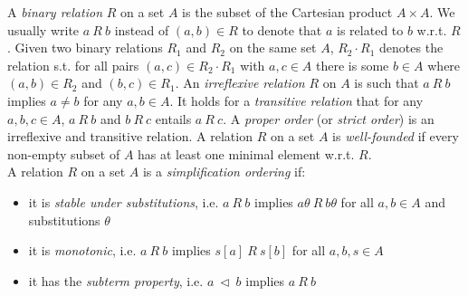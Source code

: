 A \textit{binary relation} $R$ on a set $A$ is the subset of the Cartesian product $A\times A$. We usually write $a\ R\ b$ instead of $(a,b)\in R$ to denote that $a$ is related to $b$ w.r.t. $R$. Given two binary relations $R_1$ and $R_2$ on the same set $A$, $R_2\cdot R_1$ denotes the relation s.t. for all pairs $(a,c)\in R_2\cdot R_1$ with $a,c\in A$ there is some $b\in A$ where $(a,b)\in R_2$ and $(b,c)\in R_1$. An \textit{irreflexive relation} $R$ on $A$ is such that $a\ R\ b$ implies $a\neq b$ for any $a,b\in A$. It holds for a \textit{transitive relation} that for any $a,b,c\in A$, $a\ R\ b$ and $b\ R\ c$ entails $a\ R\ c$. A \textit{proper order} (or \textit{strict order}) is an irreflexive and transitive relation. A relation $R$ on a set $A$ is \textit{well-founded} if every non-empty subset of $A$ has at least one minimal element w.r.t. $R$.\medskip\\
A relation $R$ on a set $A$ is a \textit{simplification ordering} if:
\begin{itemize}
	\item it is \textit{stable under substitutions}, i.e. $a\ R\ b$ implies $a\theta\ R\ b\theta$ for all $a, b\in A$ and substitutions $\theta$
	\item it is \textit{monotonic}, i.e. $a\ R\ b$ implies $s[a]\ R\ s[b]$ for all $a,b,s\in A$
	\item it has the \textit{subterm property}, i.e. $a\ \triangleleft\ b$ implies $a\ R\ b$
\end{itemize}
